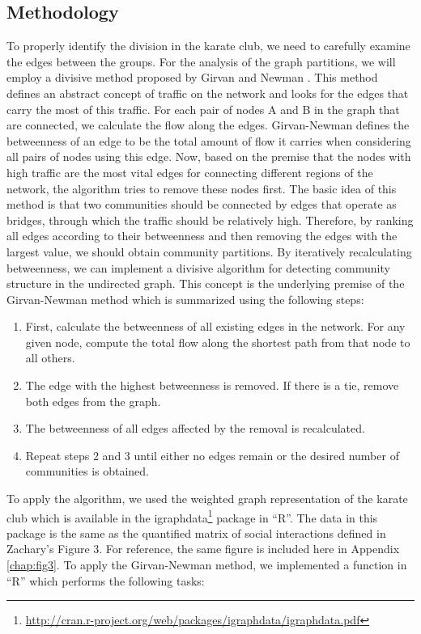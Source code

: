 \documentclass[letterpaper,11pt]{report}
\begin{document}
\begin{savenotes}
\subsection{Methodology}To properly identify the division in the karate club, we need to carefully examine the edges between the groups. For the analysis of the graph partitions, we will employ a divisive method proposed by Girvan and Newman \cite{girvan2001community}. This method defines an abstract concept of traffic on the network and looks for the edges that carry the most of this traffic. For each pair of nodes A and B in the graph that are connected, we calculate the flow along the edges. Girvan-Newman defines the betweenness of an edge to be the total amount of flow it carries when considering all pairs of nodes using this edge.  Now, based on the premise that the nodes with high traffic are the most vital edges for connecting different regions of the network, the algorithm tries to remove these nodes first. The basic idea of this method is that two communities should be connected by edges that operate as bridges, through which the traffic should be relatively high. Therefore, by ranking all edges according to their betweenness and then removing the edges with the largest value, we should obtain community partitions. By iteratively recalculating betweenness, we can implement a divisive algorithm for detecting community structure in the undirected graph. This concept is the underlying premise of the Girvan-Newman method which is summarized using the following steps:

\begin{enumerate}
\item First, calculate the betweenness of all existing edges in the network. For any given node, compute the total flow along the shortest path from that node to all others.
\item The edge with the highest betweenness is removed. If there is a tie, remove both edges from the graph. 
\item The betweenness of all edges affected by the removal is recalculated.
\item Repeat steps 2 and 3 until either no edges remain or the desired number of communities is obtained.
\end{enumerate}

To apply the algorithm, we used the weighted graph representation of the karate club which is available in the igraphdata\footnote{\url{http://cran.r-project.org/web/packages/igraphdata/igraphdata.pdf}} package in ``R''. The data in this package is the same as the quantified matrix of social interactions defined in Zachary's\cite{zachary1977information} Figure 3. For reference, the same figure is included here in Appendix \ref{chap:fig3}. To apply the Girvan-Newman method, we implemented a function in ``R'' which performs the following tasks:


\end{savenotes}
\end{document}
